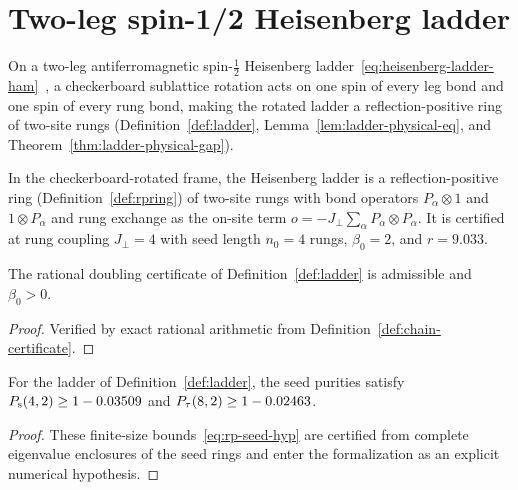 \section{Two-leg spin-1/2 Heisenberg ladder}

On a two-leg antiferromagnetic spin-\(\tfrac12\) Heisenberg
ladder~\eqref{eq:heisenberg-ladder-ham}~\cite{Dagotto1996Surprises}, a checkerboard sublattice
rotation acts on one spin of every leg bond and one spin of every rung bond, making the rotated
ladder a reflection-positive ring of two-site rungs (Definition~\ref{def:ladder},
Lemma~\ref{lem:ladder-physical-eq}, and Theorem~\ref{thm:ladder-physical-gap}).

\begin{definition}
  \label{def:ladder}
  \leanok
  In the checkerboard-rotated frame, the Heisenberg ladder is a reflection-positive ring
  (Definition~\ref{def:rpring}) of two-site rungs with bond operators \(P_\alpha \otimes 1\) and
  \(1 \otimes P_\alpha\) and rung exchange as the on-site term
  \(o = -J_\perp \sum_\alpha P_\alpha \otimes P_\alpha\). It is certified at rung coupling
  \(J_\perp = 4\) with seed length \(n_0 = 4\) rungs, \(\beta_0 = 2\), and \(r = 9.033\).
\end{definition}

\begin{lemma}
  \label{lem:ladder-valid}
  \leanok
  The rational doubling certificate of Definition~\ref{def:ladder} is admissible and \(\beta_0 > 0\).
\end{lemma}
\begin{proof}
  \leanok
  Verified by exact rational arithmetic from Definition~\ref{def:chain-certificate}.
\end{proof}

\begin{lemma}
  \label{lem:ladder-seeds}
  \leanok
  For the ladder of Definition~\ref{def:ladder}, the seed purities satisfy
  \(P_{\mathrm{s}}(4, 2) \ge 1 - 0.03509\) and \(P_{\tau}(8, 2) \ge 1 - 0.02463\).
\end{lemma}
\begin{proof}
  These finite-size bounds~\eqref{eq:rp-seed-hyp} are certified from complete eigenvalue enclosures
  of the seed rings and enter the formalization as an explicit numerical hypothesis.
\end{proof}

